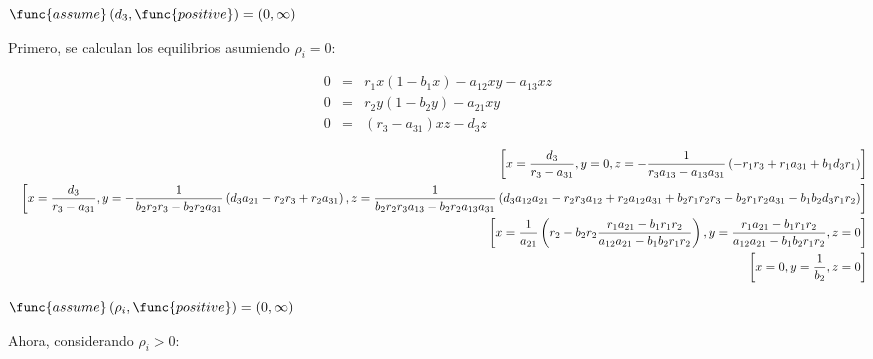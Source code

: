 \documentclass[letterpaper,11pt]{article}
\begin{document}
$\func{assume}\left( d_{3},\func{positive}\right) =\allowbreak \left(
0,\infty \right) $

\bigskip Primero, se calculan los equilibrios asumiendo $\rho _{i}=0:$

\begin{eqnarray*}
0 &=&r_{1}x(1-b_{1}x)-a_{12}xy-a_{13}xz \\
0 &=&r_{2}y(1-b_{2}y)-a_{21}xy \\
0 &=&(r_{3}-a_{31})xz-d_{3}z
\end{eqnarray*}

\begin{eqnarray*}
&&\left[ x=\frac{d_{3}}{r_{3}-a_{31}},y=0,z=-\frac{1}{%
r_{3}a_{13}-a_{13}a_{31}}\left(
-r_{1}r_{3}+r_{1}a_{31}+b_{1}d_{3}r_{1}\right) \right] \\
&&\left[ x=\frac{d_{3}}{r_{3}-a_{31}},y=-\frac{1}{%
b_{2}r_{2}r_{3}-b_{2}r_{2}a_{31}}\left(
d_{3}a_{21}-r_{2}r_{3}+r_{2}a_{31}\right) ,z=\frac{1}{%
b_{2}r_{2}r_{3}a_{13}-b_{2}r_{2}a_{13}a_{31}}\left(
d_{3}a_{12}a_{21}-r_{2}r_{3}a_{12}+r_{2}a_{12}a_{31}+b_{2}r_{1}r_{2}r_{3}-b_{2}r_{1}r_{2}a_{31}-b_{1}b_{2}d_{3}r_{1}r_{2}\right) %
\right] \\
&&\left[ x=\frac{1}{a_{21}}\left( r_{2}-b_{2}r_{2}\frac{%
r_{1}a_{21}-b_{1}r_{1}r_{2}}{a_{12}a_{21}-b_{1}b_{2}r_{1}r_{2}}\right) ,y=%
\frac{r_{1}a_{21}-b_{1}r_{1}r_{2}}{a_{12}a_{21}-b_{1}b_{2}r_{1}r_{2}},z=0%
\right] \\
&&\left[ x=0,y=\frac{1}{b_{2}},z=0\right]
\end{eqnarray*}

\bigskip $\func{assume}\left( \rho _{i},\func{positive}\right) =\allowbreak
\left( 0,\infty \right) $

Ahora, considerando $\rho _{i}>0:$
\end{document}
